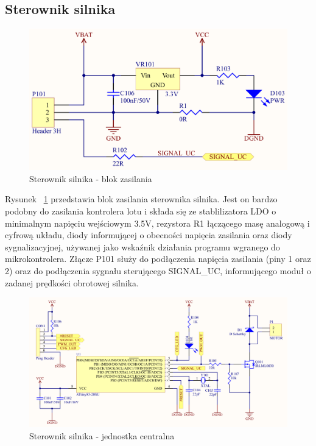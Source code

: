 \subsection{Sterownik silnika}

\begin{figure}[H]
	\centering
	\includegraphics[scale=0.45]{Pictures/MotorController_PWR_C.png}
		\caption[Sterownik silnika - blok zasilania]{Sterownik silnika - blok zasilania}
	\label{fig:MotorDriver_PWR}
\end{figure}

Rysunek ~\ref{fig:MotorDriver_PWR} przedstawia blok zasilania sterownika silnika. Jest on bardzo podobny do zasilania kontrolera lotu i składa się ze stablilizatora LDO o minimalnym napięciu wejściowym 3.5V, rezystora R1 łączącego masę analogową i cyfrową układu, diody informującej o obecności napięcia zasilania oraz diody sygnalizacyjnej, używanej jako wskaźnik działania programu wgranego do mikrokontrolera. Złącze P101 służy do podłączenia napięcia zasilania (piny 1 oraz 2) oraz do podłączenia sygnału sterującego SIGNAL\_UC, informującego moduł o zadanej prędkości obrotowej silnika.

\begin{figure}[H]
	\centering
	\includegraphics[scale=0.30, angle=90]{Pictures/MotorController_Main_C.png}
		\caption[Sterownik silnika - jednostka centralna]{Sterownik silnika - jednostka centralna}
	\label{fig:MotorDriver_MAIN}
\end{figure}

